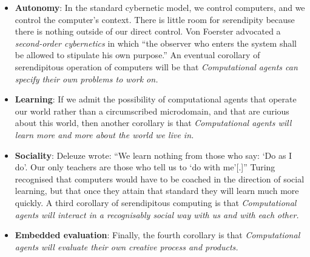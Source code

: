 \begin{itemize}
\item \textbf{Autonomy}: In the standard cybernetic model, we control computers, and we control the computer's context.  There is little room for serendipity because there is nothing outside of our direct control. Von Foerster \citeyear[p. 286]{von2003cybernetics} advocated a \emph{second-order cybernetics} in which ``the observer who enters the system shall be allowed to stipulate his own purpose.'' An eventual corollary of serendipitous operation of computers will be that \emph{Computational agents can specify their own problems to work on.}
\item \textbf{Learning}: If we admit the possibility of computational agents that operate our world rather than a circumscribed microdomain, and that are curious about this world, then another corollary is that \emph{Computational agents will learn more and more about the world we live in.}
\item \textbf{Sociality}:  Deleuze \citeyear[p. 26]{deleuze1994difference} wrote: ``We learn nothing from those who say: `Do as I do'. Our only teachers are those who tell us to `do with me'[.]''  Turing recognised that computers would have to be coached in the direction of social learning, but that once they attain that standard they will learn much more quickly.  A third corollary of serendipitous computing is that \emph{Computational agents will interact in a recognisably social way with us and with each other.}
\item \textbf{Embedded evaluation}: Finally, the fourth corollary is that \emph{Computational agents will evaluate their own creative process and products.}
\end{itemize}


